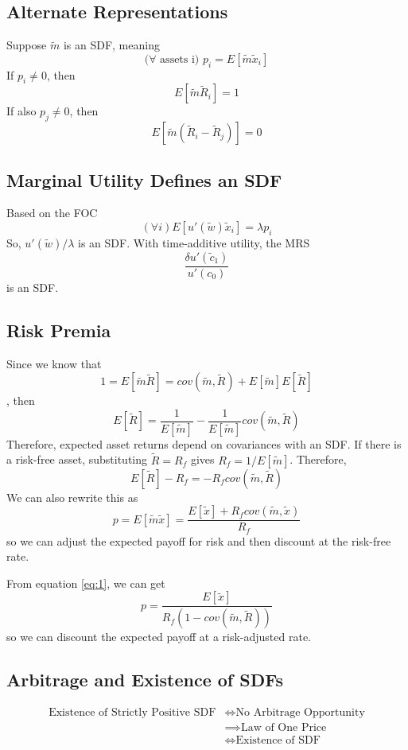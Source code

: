 \documentclass[11pt, a4paper, oneside]{article}
\theoremstyle{definition}
\theoremstyle{proposition}
\theoremstyle{corollary}
\theoremstyle{lemma}
\theoremstyle{theorem}
\begin{document}
\subsection{Alternate Representations}
Suppose $\tilde{m}$ is an SDF, meaning
$$(\forall \text{ assets i) } p_i = E[\tilde{m}\tilde{x}_i]$$
If $p_i \neq 0$, then $$E[\tilde{m}\tilde{R}_i] = 1$$
If also $p_j \neq 0$, then
$$E[\tilde{m}(\tilde{R}_i- \tilde{R}_j)] =0$$ 

\subsection{Marginal Utility Defines an SDF}
Based on the FOC
$$(\forall i) E[u'(\tilde{w})\tilde{x}_i] = \lambda p_i$$
So, $u'(\tilde{w})/\lambda$ is an SDF. With time-additive utility, the MRS
$$\frac{\delta u'(\tilde{c}_1)}{u'(c_0)}$$ is an SDF. 

\subsection{Risk Premia}
Since we know that $$1 = E[\tilde{m}\tilde{R}] = cov(\tilde{m}, \tilde{R})+ E[\tilde{m}]E[\tilde{R}]$$, then
$$E[\tilde{R}] = \frac{1}{E[\tilde{m}]} - \frac{1}{E[\tilde{m}]}cov(\tilde{m}, \tilde{R})$$ 
Therefore, expected asset returns depend on covariances with an SDF. If there is a risk-free asset, substituting $\tilde{R}=R_f$ gives $R_f = 1/E[\tilde{m}]$. Therefore, 
\begin{equation}\label{eq:1}
E[\tilde{R}] - R_f = -R_f cov(\tilde{m}, \tilde{R})
\end{equation}
We can also rewrite this as 
$$p = E[\tilde{m}\tilde{x}] = \frac{E[\tilde{x}] + R_f cov(\tilde{m}, \tilde{x})}{R_f}$$ so we can adjust the expected payoff for risk and then discount at the risk-free rate. 

From equation \eqref{eq:1}, we can get
$$p = \frac{E[\tilde{x}]}{R_f(1- cov(\tilde{m}, \tilde{R}))}$$
so we can discount the expected payoff at a risk-adjusted rate. 

\subsection{Arbitrage and Existence of SDFs}
\begin{align*}
\text{Existence of Strictly Positive SDF} &\iff \text{No Arbitrage Opportunity}\\
&\implies \text{Law of One Price}\\
&\iff \text{Existence of SDF}  
\end{align*}
\end{document}
